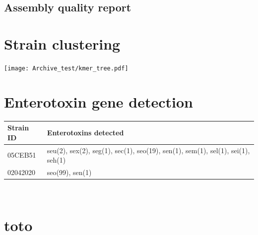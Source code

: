 \documentclass[a4paper]{article}
\begin{document}
\subsection{Assembly quality report}

\begin{center}
\end{center}





\section{Strain clustering}

\begin{center}
 \texttt{[image: Archive\_test/kmer\_tree.pdf]} %
\end{center}


\section{Enterotoxin gene detection}

{\renewcommand{\arraystretch}{1.5} %
{\setlength{\tabcolsep}{1cm} %
\centering
\begin{tabular}{|l|l|}
  \hline
  \textbf{Strain ID} & \textbf{Enterotoxins detected} \\
  \hline
  05CEB51 & seu(2), sex(2), seg(1), sec(1), seo(19), sen(1), sem(1), sel(1), sei(1), seh(1) \\%
  02042020 & {\color{red} seo(99)}, sen(1) \\%
  \hline
\end{tabular}\\
}}




\section{toto}
\end{document}
